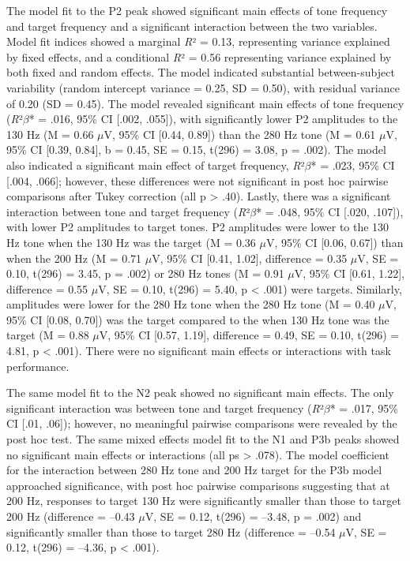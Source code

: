 \documentclass{article}
\begin{document}
The model fit to the P2 peak showed significant main effects of tone frequency and target frequency and a significant interaction between the two variables. Model fit indices showed a marginal \textit{R}² = 0.13, representing variance explained by fixed effects, and a conditional \textit{R}² = 0.56 representing variance explained by both fixed and random effects. The model indicated substantial between-subject variability (random intercept variance = 0.25, SD = 0.50), with residual variance of 0.20 (SD = 0.45). The model revealed significant main effects of tone frequency (\textit{R}²$\beta$* = .016, 95\% CI [.002, .055]), with significantly lower P2 amplitudes to the 130 Hz  (M = 0.66 $\mu$V, 95\% CI [0.44, 0.89]) than the 280 Hz tone (M = 0.61 $\mu$V, 95\% CI [0.39, 0.84], b = 0.45, SE = 0.15, t(296) = 3.08, p = .002). The model also indicated a significant main effect of target frequency, \textit{R}²$\beta$* = .023, 95\% CI [.004, .066]; however, these differences were not significant in post hoc pairwise comparisons after Tukey correction (all p > .40). Lastly, there was a significant interaction between tone and target frequency (\textit{R}²$\beta$* = .048, 95\% CI [.020, .107]), with lower P2 amplitudes to target tones. P2 amplitudes were lower to the 130 Hz tone when the 130 Hz was the target (M = 0.36 $\mu$V, 95\% CI [0.06, 0.67]) than when the 200 Hz (M = 0.71 $\mu$V, 95\% CI [0.41, 1.02], difference = 0.35 $\mu$V, SE = 0.10, t(296) = 3.45, p = .002) or 280 Hz tones (M = 0.91 $\mu$V, 95\% CI [0.61, 1.22], difference = 0.55 $\mu$V, SE = 0.10, t(296) = 5.40, p < .001) were targets. Similarly, amplitudes were lower for the 280 Hz tone when the 280 Hz tone (M = 0.40 $\mu$V, 95\% CI [0.08, 0.70]) was the target compared to the when 130 Hz tone was the target (M = 0.88 $\mu$V, 95\% CI [0.57, 1.19], difference = 0.49, SE = 0.10, t(296) = 4.81, p < .001). There were no significant main effects or interactions with task performance.

The same model fit to the N2 peak showed no significant main effects. The only significant interaction was between tone and target frequency (\textit{R}²$\beta$* = .017, 95\% CI [.01, .06]); however, no meaningful pairwise comparisons were revealed by the post hoc test. The same mixed effects model fit to the N1 and P3b peaks showed no significant main effects or interactions (all ps > .078). The model coefficient for the interaction between 280 Hz tone and 200 Hz target for the P3b model approached significance, with post hoc pairwise comparisons suggesting that at 200 Hz, responses to target 130 Hz were significantly smaller than those to target 200 Hz (difference = –0.43 $\mu$V, SE = 0.12, t(296) = –3.48, p = .002) and significantly smaller than those to target 280 Hz (difference = –0.54 $\mu$V, SE = 0.12, t(296) = –4.36, p < .001). 
\end{document}
